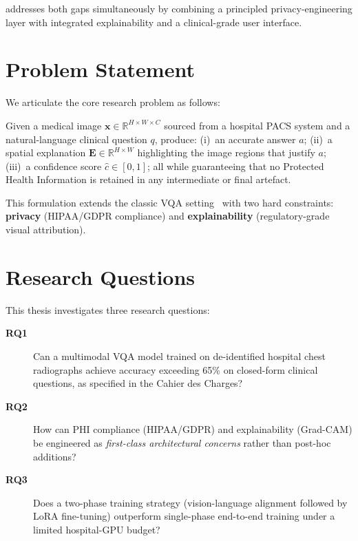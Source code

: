 \medxplain{} addresses both gaps simultaneously by combining a principled
privacy-engineering layer with integrated explainability and a clinical-grade
user interface.

\section{Problem Statement}
\label{sec:problem}

We articulate the core research problem as follows:

\begin{warningbox}
Given a medical image $\mathbf{x} \in \mathbb{R}^{H \times W \times C}$
sourced from a hospital PACS system and a natural-language clinical
question $q$, produce: (i)~an accurate answer $a$; (ii)~a spatial
explanation $\mathbf{E} \in \mathbb{R}^{H \times W}$ highlighting the image
regions that justify $a$; (iii)~a confidence score $\hat{c} \in [0,1]$;
all while guaranteeing that no Protected Health Information is retained in
any intermediate or final artefact.
\end{warningbox}

This formulation extends the classic VQA setting~\citep{antol2015vqa} with
two hard constraints: \textbf{privacy} (HIPAA/GDPR compliance) and
\textbf{explainability} (regulatory-grade visual attribution).

\section{Research Questions}
\label{sec:rqs}

This thesis investigates three research questions:

\begin{description}
  \item[\textbf{RQ1}] Can a multimodal VQA model trained on de-identified
        hospital chest radiographs achieve accuracy exceeding 65\% on
        closed-form clinical questions, as specified in the Cahier des
        Charges?
  \item[\textbf{RQ2}] How can PHI compliance (HIPAA/GDPR) and
        explainability (Grad-CAM) be engineered as \emph{first-class
        architectural concerns} rather than post-hoc additions?
  \item[\textbf{RQ3}] Does a two-phase training strategy (vision-language
        alignment followed by LoRA fine-tuning) outperform single-phase
        end-to-end training under a limited hospital-GPU budget?
\end{description}

